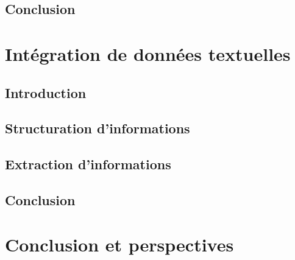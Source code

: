 \chapter{Conclusion}



\part{Intégration de données textuelles}

\chapter{Introduction}


\chapter{Structuration d'informations}
\minitoc


\chapter{Extraction d'informations}
\minitoc


\chapter{Conclusion}



\part{Conclusion et perspectives}


\cleardoublepage    %
\appendix

\clearpage
\backmatter


\printglossary
{}
\printglossary[type=acronym]
